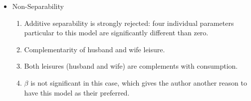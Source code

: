 \documentclass[notes=show]{beamer}
\begin{document}
\begin{frame}%



\begin{itemize}
\item Non-Separability

\begin{enumerate}
\item Additive separability is strongly rejected: four individual parameters
particular to this model are significantly different than zero. 

\item Complementarity of husband and wife leisure.

\item Both leisures (husband and wife) are complements with consumption.

\item $\beta $ is not significant in this case, which gives the author
another reason to have this model as their preferred.
\end{enumerate}
\end{itemize}

\transboxout%
\end{frame}%

\bigskip
\end{document}
